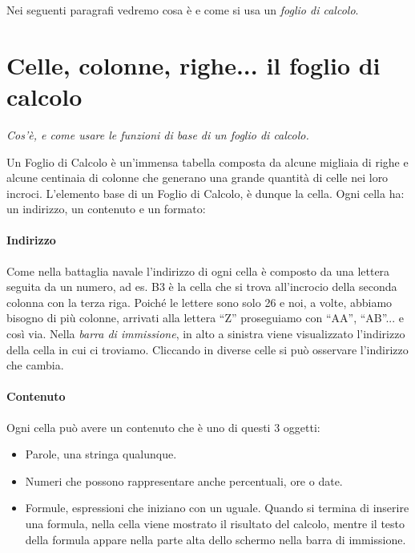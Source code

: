 Nei seguenti paragrafi vedremo cosa è e come si usa un \emph{foglio di calcolo}.

\section{Celle, colonne, righe... il foglio di calcolo}
\label{05_01_f_di_calc:celle-colonne-righe-il-foglio-di-calcolo}

\emph{Cos'è, e come usare le funzioni di base di un foglio di calcolo.}

Un Foglio di Calcolo è un'immensa tabella composta da alcune migliaia di
righe e alcune centinaia di colonne che generano una grande quantità di
celle nei loro incroci.
L'elemento base di un Foglio di Calcolo, è dunque la cella.
Ogni cella ha: un indirizzo, un contenuto e un  formato:

\paragraph{Indirizzo}

Come nella battaglia navale l'indirizzo di ogni cella è composto da una
lettera seguita da un numero, ad es. B3 è la cella che si trova all'incrocio
della seconda colonna con la terza riga. Poiché le lettere sono solo 26 e
noi, a volte, abbiamo bisogno di più colonne, arrivati alla lettera ``Z''
proseguiamo con ``AA'', ``AB''... e così via.
Nella \emph{barra di immissione}, in alto a sinistra viene visualizzato
l'indirizzo della cella in cui ci troviamo.
Cliccando in diverse celle si può osservare l'indirizzo che cambia.

\paragraph{Contenuto}

Ogni cella può avere un contenuto che è uno di questi 3 oggetti:

\begin{itemize} [noitemsep]
\item Parole, una stringa qualunque.
\item Numeri che possono rappresentare anche percentuali, ore o date.
\item {}
Formule, espressioni che iniziano con un uguale. Quando si termina di
inserire una formula, nella cella viene mostrato il risultato del calcolo,
mentre il testo della formula appare nella parte alta dello schermo nella
barra di immissione.
\end{itemize}

